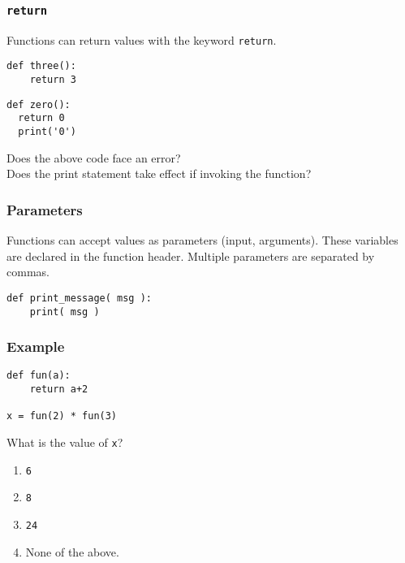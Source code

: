 \documentclass[11pt]{beamer}
\begin{document}
\begin{frame}[fragile]
  \frametitle{\texttt{return}}
  \Enlarge

  \begin{itemize}
  \myitem  Functions can return values with the keyword \texttt{return}. %
    \begin{Verbatim}[commandchars=\\\{\},commentchar=\%]
def three():
    return 3
    \end{Verbatim}
  \myitem  %
    \begin{Verbatim}[commandchars=\\\{\},commentchar=\%]
def zero():
  return 0
  print('0')
    \end{Verbatim}
   \myitem Does the above code face an error?\\
   \myitme Does the print statement take effect if invoking the function? 
  \end{itemize}
\end{frame}

\begin{frame}[fragile]
  \frametitle{Parameters}
  \Enlarge

  \begin{itemize}
  \myitem  Functions can accept values as parameters (input, arguments). %
  \myitem  These variables are declared in the function header. %
  \myitem  Multiple parameters are separated by commas. %
  \end{itemize}
  \begin{Verbatim}[commandchars=\\\{\},commentchar=\%]
def print_message( msg ):
    print( msg )
  \end{Verbatim}
\end{frame}

\begin{frame}[fragile]
  \frametitle{Example}
  \Enlarge

  \begin{Verbatim}[commandchars=\\\{\},commentchar=\%]
def fun(a):
    return a+2

x = fun(2) * fun(3)
  \end{Verbatim}
  What is the value of \texttt{x}?
  \begin{enumerate}[label=\Alph*]
  \item  \texttt{6}
  \item  \texttt{8}
  \item  \texttt{24}
  \item  None of the above.   %
  \end{enumerate}
\end{frame}
\end{document}
